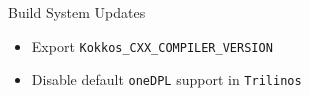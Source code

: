 


\begin{frame}[fragile]{Build System Updates}
\begin{itemize}
  \item Export \texttt{Kokkos\_CXX\_COMPILER\_VERSION}
  \item Disable default \texttt{oneDPL} support in \texttt{Trilinos}
\end{itemize}
\end{frame}


